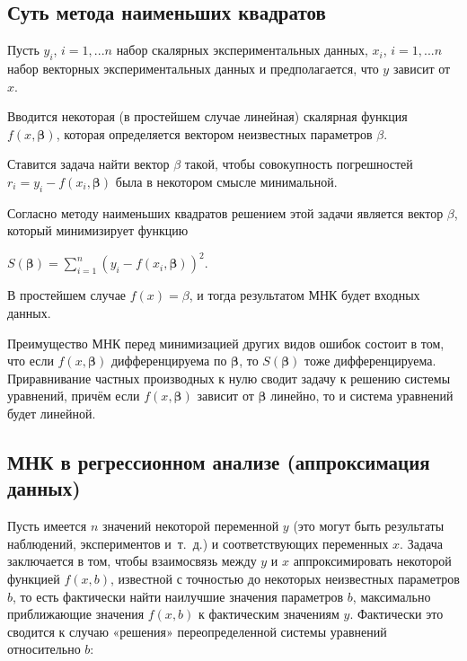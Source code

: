 \documentclass[a4paper]{article}
\begin{document}
{{{{{{{{\subsection{Суть метода наименьших квадратов}

Пусть {{\(y_{i}\)}}, {{\(i = 1,...n\)}} набор скалярных
экспериментальных данных, {{\(x_{i}\)}}, {{\(i = 1,...n\)}} набор
векторных экспериментальных данных и предполагается, что {{\(y\)}}
зависит от {{\(x\)}}.

Вводится некоторая (в простейшем случае линейная) скалярная функция
{{\(f(x,\mathbf{\beta})\)}}, которая определяется вектором неизвестных
параметров {{\(\beta\)}}.

Ставится задача найти вектор {{\(\beta\)}} такой, чтобы совокупность
погрешностей {{\(r_{i} = y_{i} - f(x_{i},\mathbf{\beta})\)}} была в
некотором смысле минимальной.

Согласно методу наименьших квадратов решением этой задачи является
вектор {{\(\beta\)}}, который минимизирует функцию

\begin{center}
 {{\(S(\mathbf{\beta}) = \sum\limits_{i = 1}^{n}(y_{i} - f(x_{i},\mathbf{\beta}))^{2}.\)}}
\end{center}

В простейшем случае {{\(f(x) = \beta\)}}, и тогда результатом МНК будет
входных данных.

Преимущество МНК перед минимизацией других видов ошибок состоит в том,
что если {{\(f(x,\mathbf{\beta})\)}} дифференцируема по
{{\(\mathbf{\beta}\)}}, то {{\(S(\mathbf{\beta})\)}} тоже
дифференцируема. Приравнивание частных производных к нулю сводит задачу
к решению системы уравнений, причём если {{\(f(x,\mathbf{\beta})\)}}
зависит от {{\(\mathbf{\beta}\)}} линейно, то и система уравнений будет
линейной.

\subsection{МНК в регрессионном анализе (аппроксимация данных)}

Пусть имеется {{\(n\)}} значений некоторой переменной {{\(y\)}} (это
могут быть результаты наблюдений, экспериментов и~т.~д.) и
соответствующих переменных {{\(x\)}}. Задача заключается в том, чтобы
взаимосвязь между {{\(y\)}} и {{\(x\)}} аппроксимировать некоторой
функцией {{\(f(x,b)\)}}, известной с точностью до некоторых неизвестных
параметров {{\(b\)}}, то есть фактически найти наилучшие значения
параметров {{\(b\)}}, максимально приближающие значения {{\(f(x,b)\)}} к
фактическим значениям {{\(y\)}}. Фактически это сводится к случаю
«решения» переопределенной системы уравнений относительно {{\(b\)}}:

}}}}}}}}
\end{document}
